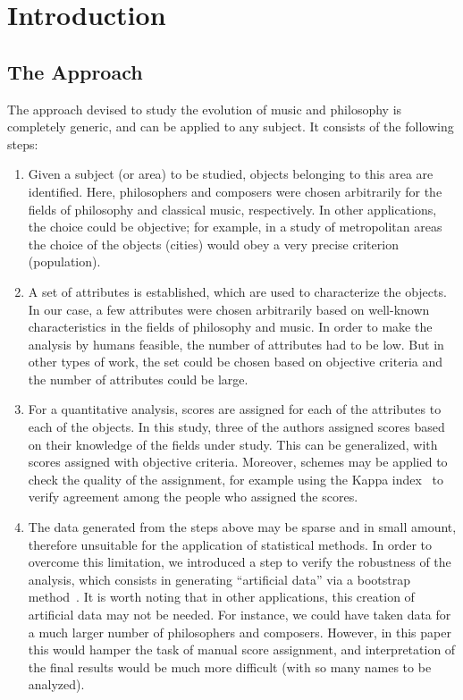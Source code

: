 \documentclass[
 aip,
 jmp,
 amsmath,amssymb,
 reprint,
]{revtex4-1}
\begin{document}
\section{\label{sec:level1}Introduction}

\subsection{The Approach}

The approach devised to study the evolution of music and philosophy is
completely generic, and can be applied to any subject. It consists of
the following steps:

\begin{enumerate}
  \item{Given a subject (or area) to be studied, objects belonging to
    this area are identified. Here, philosophers and composers were
    chosen arbitrarily for the fields of philosophy and classical
    music, respectively. In other applications, the choice could be
    objective; for example, in a study of metropolitan areas the
    choice of the objects (cities) would obey a very precise criterion
    (population).}

  \item{A set of attributes is established, which are used to
    characterize the objects. In our case, a few attributes were
    chosen arbitrarily based on well-known characteristics in the
    fields of philosophy and music. In order to make the analysis by
    humans feasible, the number of attributes had to be low. But in
    other types of work, the set could be chosen based on objective
    criteria and the number of attributes could be large.}

  \item{For a quantitative analysis, scores are assigned for each of
    the attributes to each of the objects. In this study, three of the
    authors assigned scores based on their knowledge of the fields
    under study. This can be generalized, with scores assigned with
    objective criteria. Moreover, schemes may be applied to check the
    quality of the assignment, for example using the Kappa
    index~\cite{Cohen1960} to verify agreement among the people who
    assigned the scores.}

  \item{The data generated from the steps above may be sparse and in
    small amount, therefore unsuitable for the application of
    statistical methods. In order to overcome this limitation, we
    introduced a step to verify the robustness of the analysis, which
    consists in generating ``artificial data'' via a bootstrap
    method~\cite{Boos2003}. It is worth noting that in other
    applications, this creation of artificial data may not be
    needed. For instance, we could have taken data for a much larger
    number of philosophers and composers. However, in this paper this
    would hamper the task of manual score assignment, and
    interpretation of the final results would be much more difficult
    (with so many names to be analyzed).}


\end{enumerate}
\end{document}
